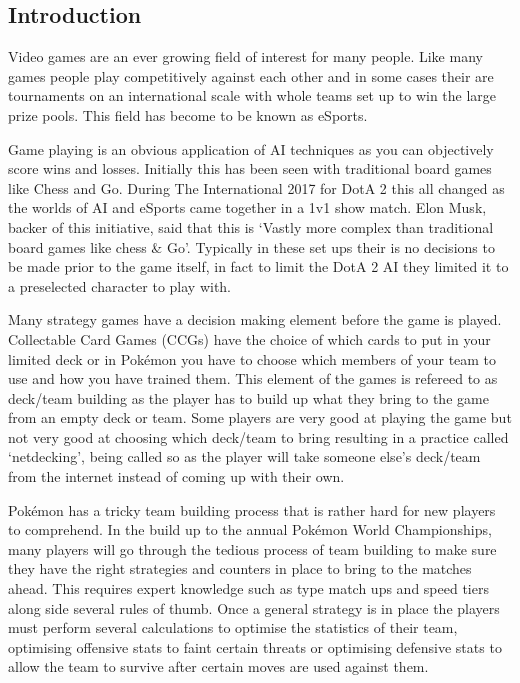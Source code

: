 \documentclass[a4paper]{article}
\newcommand{\Pokemon}{Pok\'{e}mon}
\begin{document}
\subsection{Introduction}
\par
Video games are an ever growing field of interest for many people.
Like many games people play competitively against each other and in some cases their are tournaments on an international scale with whole teams set up to win the large prize pools\cite{eSportsPrize}\cite{teamEarnings}.
This field has become to be known as eSports.
\par
Game playing is an obvious application of AI techniques as you can objectively score wins and losses.
Initially this has been seen with traditional board games like Chess\cite{deepBlue} and Go\cite{alphaGo}.
During The International 2017 for DotA 2 this all changed as the worlds of AI and eSports came together in a 1v1 show match\cite{openAI}.
Elon Musk, backer of this initiative, said that this is `Vastly more complex than traditional board games like chess \& Go'\cite{openAI}.
Typically in these set ups their is no decisions to be made prior to the game itself, in fact to limit the DotA 2 AI they limited it to a preselected character to play with.
\par
Many strategy games have a decision making element before the game is played.
Collectable Card Games (CCGs) have the choice of which cards to put in your limited deck or in \Pokemon{} you have to choose which members of your team to use and how you have trained them.
This element of the games is refereed to as deck/team building as the player has to build up what they bring to the game from an empty deck or team.
Some players are very good at playing the game but not very good at choosing which deck/team to bring resulting in a practice called `netdecking', being called so as the player will take someone else's deck/team from the internet instead of coming up with their own.
\par
\Pokemon{} has a tricky team building process that is rather hard for new players to comprehend.
In the build up to the annual \Pokemon{} World Championships, many players will go through the tedious process of team building to make sure they have the right strategies and counters in place to bring to the matches ahead\cite{worldsOverview}.
This requires expert knowledge such as type match ups and speed tiers along side several rules of thumb.
Once a general strategy is in place the players must perform several calculations to optimise the statistics of their team, optimising offensive stats to faint certain threats or optimising defensive stats to allow the team to survive after certain moves are used against them.
\end{document}

